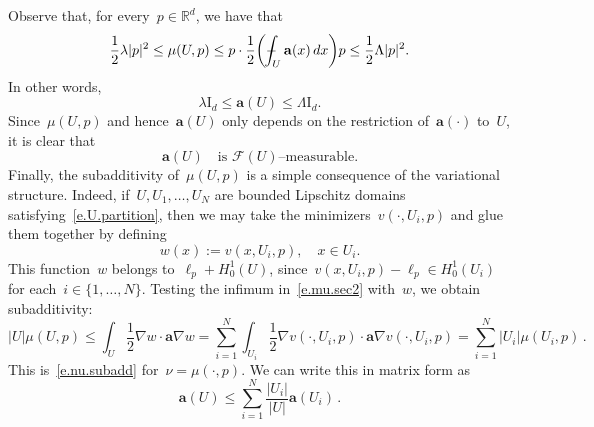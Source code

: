 \documentclass[11pt,twoside]{article} %
\numberwithin{equation}{section}
\theoremstyle{definition}
\newcommand*{\Id}{\ensuremath{\mathrm{I}_d}}
\newcommand*{\Rd}{\ensuremath{\mathbb{R}^d}}
\renewcommand{\a}{\mathbf{a}}
\newcommand{\F}{\mathcal{F}}
\def\Xint#1{\mathchoice
{\XXint\displaystyle\textstyle{#1}}%
{\XXint\textstyle\scriptstyle{#1}}%
{\XXint\scriptstyle\scriptscriptstyle{#1}}%
{\XXint\scriptscriptstyle\scriptscriptstyle{#1}}%
\!\int}
\def\XXint#1#2#3{{\setbox0=\hbox{$#1{#2#3}{\int}$}
\vcenter{\hbox{$#2#3$}}\kern-.5\wd0}}
\def\fint{\Xint-}
\begin{document}
\smallskip

Observe that, for every~$p\in\Rd$, we have that 
\begin{equation}
\label{e.mu.bounds.sec2}
\frac12 \lambda |p|^2 \leq \mu(U,p) \leq p\cdot \frac12\biggl(\fint_U \a(x)\,dx\biggr) p \leq \frac12 {\Lambda}|p|^2.
\end{equation}
In other words, 
\begin{equation*}
\lambda  \Id \leq \a(U) \leq \Lambda  \Id. 
\end{equation*}
Since~$\mu(U,p)$ and hence~$\a(U)$ only depends on the restriction of~$\a(\cdot)$ to~$U$, it is clear that
\begin{equation}
\label{e.mu.local.sec2}
\a(U) \quad \mbox{is~$\F(U)$--measurable.}
\end{equation}
Finally, the subadditivity of~$\mu(U,p)$ is a simple consequence of the variational structure.
Indeed, if~$U, U_1,\ldots,U_N$ are bounded Lipschitz domains satisfying~\eqref{e.U.partition}, then we may take the minimizers~$v(\cdot,U_i,p)$ and glue them together by defining
\begin{equation*}
w(x) := v(x,U_i,p), \quad x\in U_i. 
\end{equation*}
This function~$w$ belongs to~$\ell_p + H^1_0(U)$, since~$v(x,U_i,p) - \ell_p\in H^1_0(U_i)$ for each~$i\in\{1,\ldots,N\}$. 
Testing the infimum in~\eqref{e.mu.sec2} with~$w$, we obtain subadditivity:
\begin{equation}
\label{e.subadd.sec2}
|U| \mu(U,p) 
\leq 
\int_{U} \frac12\nabla w \cdot \a\nabla w 
=
\sum_{i=1}^N 
\int_{U_i} \frac12\nabla v(\cdot,U_i,p)  \cdot \a\nabla v(\cdot,U_i,p) 
=
\sum_{i=1}^N |U_i| \mu(U_i,p)\,.
\end{equation}
This is~\eqref{e.nu.subadd} for~$\nu = \mu(\cdot,p)$. 
We can write this in matrix form as
\begin{equation*}
\a(U) \leq \sum_{i=1}^N \frac{|U_i|}{|U|} \a(U_i)\,.
\end{equation*}


\smallskip
\end{document}
